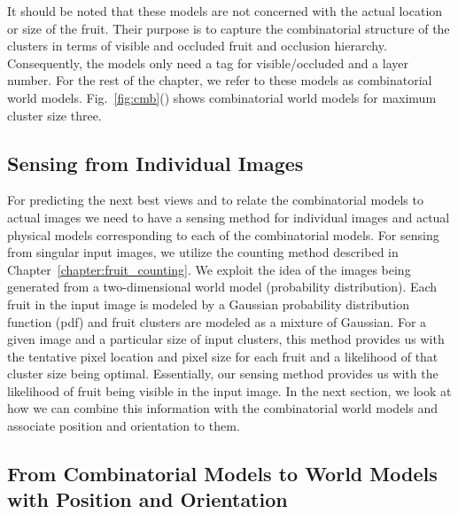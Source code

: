 It should be noted that these models are not concerned with the actual location or size of the fruit. Their purpose is to capture the combinatorial structure of the clusters in terms of visible and occluded fruit and occlusion hierarchy. Consequently, the models only need a tag for visible/occluded and a layer number. For the rest of the chapter, we refer to these models as combinatorial world models. Fig.~\ref{fig:cmb}() shows combinatorial world models for maximum cluster size three.
\subsection{Sensing from Individual Images}\label{subsec:singleImageCounting}
 
For predicting the next best views and to relate the combinatorial models to actual images we need to have a sensing method for individual images and actual physical models corresponding to each of the combinatorial models. For sensing from singular input images, we utilize the counting method described in Chapter~\ref{chapter:fruit_counting}. We exploit the idea of the images being generated from a two-dimensional world model (probability distribution). Each fruit in the input image is modeled by a Gaussian probability distribution function (pdf) and fruit clusters are modeled as a mixture of Gaussian. For a given image and a particular size of input clusters, this method provides us with the tentative pixel location and pixel size for each fruit and a likelihood of that cluster size being optimal. Essentially, our sensing method provides us with the likelihood of fruit being visible in the input image. In the next section, we look at how we can combine this information with the combinatorial world models and associate position and orientation to them.



\subsection{From Combinatorial Models to World Models with Position and Orientation}\label{subsec:physicalModel}

